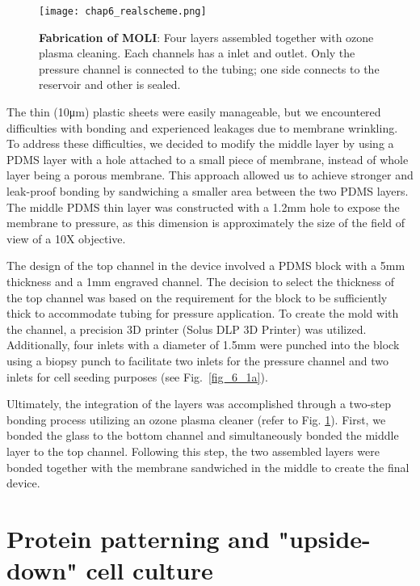 \begin{figure}[h!]
	\centering
	\texttt{[image: chap6\_realscheme.png]}
	\caption{ \textbf{Fabrication of MOLI}: Four layers assembled together with ozone plasma cleaning. Each channels has a inlet and outlet. Only the pressure channel is connected to the tubing; one side connects to the reservoir and other is sealed. 
	}\label{fig_6_2}
\end{figure}

\clearpage

The thin (10\unit{\um}) plastic sheets were easily manageable, but we encountered difficulties with bonding and experienced leakages due to membrane wrinkling. To address these difficulties, we decided to modify the middle layer by using a PDMS layer with a hole attached to a small piece of membrane, instead of whole layer being a porous membrane. This approach allowed us to achieve stronger and leak-proof bonding by sandwiching a smaller area between the two PDMS layers. The middle PDMS thin layer was constructed with a 1.2\unit{\mm} hole to expose the membrane to pressure, as this dimension is approximately the size of the field of view of a 10X objective.

The design of the top channel in the device involved a PDMS block with a 5\unit{\mm} thickness and a 1mm engraved channel. The decision to select the thickness of the top channel was based on the requirement for the block to be sufficiently thick to accommodate tubing for pressure application.  To create the mold with the channel, a precision 3D printer (Solus DLP 3D Printer) was utilized. Additionally, four inlets with a diameter of 1.5\unit{\mm} were punched into the block using a biopsy punch to facilitate two inlets for the pressure channel and two inlets for cell seeding purposes  (see Fig.~\ref{fig_6_1a}).

Ultimately, the integration of the layers was accomplished through a two-step bonding process utilizing an ozone plasma cleaner (refer to Fig. \ref{fig_6_2}). First, we bonded the glass to the bottom channel and simultaneously bonded the middle layer to the top channel. Following this step, the two assembled layers were bonded together with the membrane sandwiched in the middle to create the final device.
\vspace{-0.05cm}
\hypertarget{protein-patterning-and-inverted-cell-culture}{%
\section{Protein patterning and "upside-down" cell
culture}\label{protein-patterning-and-inverted-cell-culture}}

